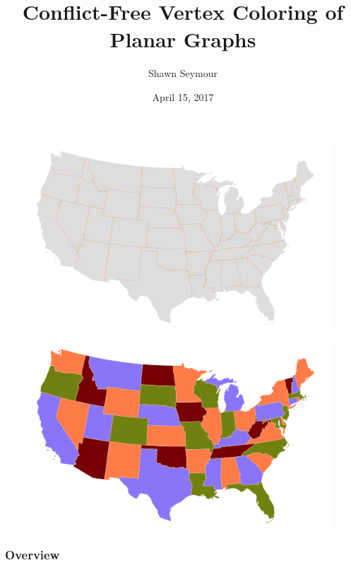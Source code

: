 \documentclass[xcolor=dvipsnames,aspectratio=1610]{beamer}
\title{Conflict-Free Vertex Coloring of Planar Graphs}
\date{April 15, 2017}
\author{Shawn Seymour}
\begin{document}
  \maketitle

  \begin{frame}
    \begin{figure}[h]
      \centering
      \includegraphics[width=14cm]{../figures/map-no-colors-3.pdf}
    \end{figure}
  \end{frame}

  \begin{frame}
    \begin{figure}[h]
      \centering
      \includegraphics[width=14cm]{../figures/map-colors.pdf}
    \end{figure}
  \end{frame}

  \begin{frame}
    \frametitle{Overview}
    \begin{multicols}{2}
      \tableofcontents
    \end{multicols}
  \end{frame}
\end{document}
